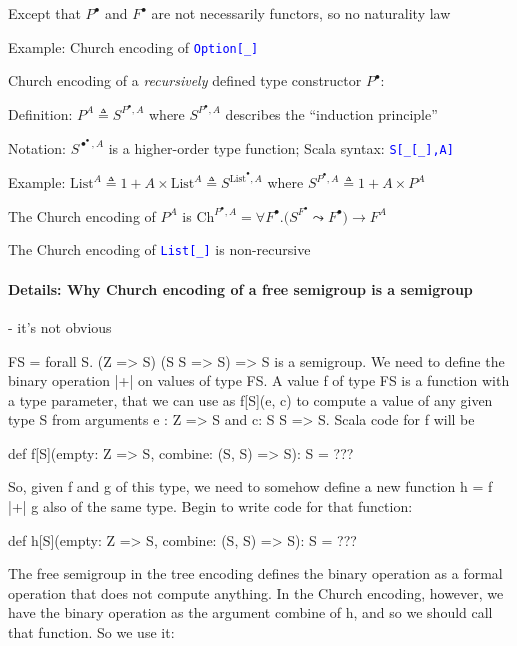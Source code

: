 Except that $P^{\bullet}$ and $F^{\bullet}$ are not necessarily
functors, so no naturality law

Example: Church encoding of \texttt{\textcolor{blue}{\footnotesize{}Option{[}\_{]}}} 

Church encoding of a \emph{recursively} defined type constructor $P^{\bullet}$:

Definition: $P^{A}\triangleq S^{P^{\bullet},A}$ where $S^{P^{\bullet},A}$
describes the \textsf{``}induction principle\textsf{''}

Notation: {\footnotesize{}$S^{\bullet^{\bullet},A}$} is a higher-order
type function; Scala syntax: \texttt{\textcolor{blue}{\footnotesize{}S{[}\_{[}\_{]},A{]}}} 

Example: $\text{List}^{A}\triangleq1+A\times\text{List}^{A}\triangleq S^{\text{List}^{\bullet},A}$
where $S^{P^{\bullet},A}\triangleq1+A\times P^{A}$ 

The Church encoding of $P^{A}$ is {\footnotesize{}$\text{Ch}^{P^{\bullet},A}=\forall F^{\bullet}.\big(S^{F^{\bullet}}\leadsto F^{\bullet}\big)\rightarrow F^{A}$}{\footnotesize\par}

The Church encoding of \texttt{\textcolor{blue}{\footnotesize{}List{[}\_{]}}}
is non-recursive

\paragraph{Details: Why Church encoding of a free semigroup is a semigroup}

- it\textsf{'}s not obvious

FS = forall S. (Z => S) \texttimes{} (S \texttimes{} S => S) => S
is a semigroup.  We need to define the binary operation |+| on values
of type FS. A value f of type FS is a function with a type parameter,
that we can use as f{[}S{]}(e, c) to compute a value of any given
type S from arguments e : Z => S and c: S \texttimes{} S => S. Scala
code for f will be

def f{[}S{]}(empty: Z => S, combine: (S, S) => S): S = ???

So, given f and g of this type, we need to somehow define a new function
h = f |+| g also of the same type. Begin to write code for that function:

def h{[}S{]}(empty: Z => S, combine: (S, S) => S): S = ???

The free semigroup in the tree encoding defines the binary operation
as a formal operation that does not compute anything. In the Church
encoding, however, we have the binary operation as the argument \textquotedbl combine\textquotedbl{}
of h, and so we should call that function. So we use it:

